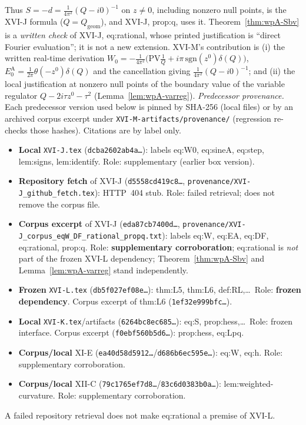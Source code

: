 \documentclass{article}
\theoremstyle{remark}
\begin{document}
Thus $S=-d=\frac1{4\pi^2}(Q-i0)^{-1}$ on $z\neq0$, including nonzero null points, is the XVI-J formula ($Q=Q_{\mathrm{geom}}$), and XVI-J, prop:q, uses it.
Theorem~\ref{thm:wpA-Sbv} is a \emph{written check} of XVI-J, eq:rational, whose printed justification is ``direct Fourier evaluation''; it is not a new extension.
XVI-M's contribution is (i) the written real-time derivation $W_0=-\frac1{4\pi^2}\bigl(\mathrm{PV}\frac1Q+i\pi\,\mathrm{sgn}(z^0)\delta(Q)\bigr)$, $E_0^{\mathrm A}=\frac1{2\pi}\theta(-z^0)\delta(Q)$ and the cancellation giving $\frac1{4\pi^2}(Q-i0)^{-1}$; and (ii) the local justification at nonzero null points of the boundary value of the variable regulator $Q-2i\tau z^0-\tau^2$ (Lemma~\ref{lem:wpA-varreg}).
\emph{Predecessor provenance.} Each predecessor version used below is pinned by SHA-256 (local files) or by an archived corpus excerpt under \texttt{XVI-M-artifacts/\allowbreak provenance/} (regression re-checks those hashes). Citations are by label only.
\begin{itemize}\setlength{\itemsep}{0.15em}\small
\item \textbf{Local} \texttt{XVI-J.tex} (\texttt{dcba2602ab4a\ldots}): labels eq:W0, eq:sineA, eq:step, lem:signs, lem:identify. Role: supplementary (earlier box version).
\item \textbf{Repository fetch} of XVI-J (\texttt{d5558cd419c8\ldots}, \texttt{provenance/XVI-J\_github\_\allowbreak fetch.tex}): HTTP~404 stub. Role: failed retrieval; does not remove the corpus file.
\item \textbf{Corpus excerpt} of XVI-J (\texttt{eda87cb7400d\ldots}, \texttt{provenance/XVI-J\_corpus\_\allowbreak eqW\_DF\_\allowbreak rational\_propq.txt}): labels eq:W, eq:EA, eq:DF, eq:rational, prop:q. Role: \textbf{supplementary corroboration}; eq:rational is \emph{not} part of the frozen XVI-L dependency; Theorem~\ref{thm:wpA-Sbv} and Lemma~\ref{lem:wpA-varreg} stand independently.
\item \textbf{Frozen} \texttt{XVI-L.tex} (\texttt{db5f027ef08e\ldots}): thm:L5, thm:L6, def:RL,\ldots\ Role: \textbf{frozen dependency}. Corpus excerpt of thm:L6 (\texttt{1ef32e999bfc\ldots}).
\item \textbf{Local} \texttt{XVI-K.tex}/artifacts (\texttt{6264bc8ec685\ldots}): eq:S, prop:hess,\ldots\ Role: frozen interface. Corpus excerpt (\texttt{f0ebf560b5d6\ldots}): prop:hess, eq:Lpq.
\item \textbf{Corpus/local} XI-E (\texttt{ea40d58d5912\ldots}/\texttt{d686b6ec595e\ldots}): eq:W, eq:h. Role: supplementary corroboration.
\item \textbf{Corpus/local} XII-C (\texttt{79c1765ef7d8\ldots}/\texttt{83c6d0383b0a\ldots}): lem:weighted-curvature. Role: supplementary corroboration.
\end{itemize}
A failed repository retrieval does not make eq:rational a premise of XVI-L.
\end{document}
